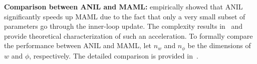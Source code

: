 \documentclass{osudissert96}
\begin{document}

\vspace{0.2cm}
{\noindent \bf Comparison between ANIL and MAML:} \cite{raghu2019rapid} empirically showed that ANIL significantly speeds up MAML due to the fact that only a very small subset of parameters go through the inner-loop update. The complexity results in~ and  provide theoretical characterization of such an acceleration. To formally compare the performance between ANIL and MAML, let $n_w$ and $n_\phi$ be the dimensions of $w$ and $\phi$, respectively. 
The detailed comparison is provided in~. 

 
\end{document}
